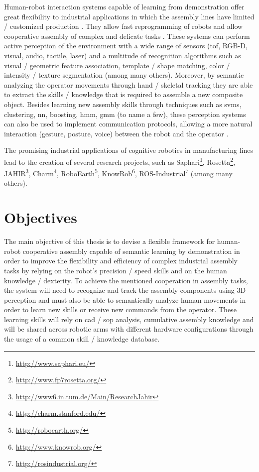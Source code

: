 Human-robot interaction systems capable of learning from demonstration offer great flexibility to industrial applications in which the assembly lines have limited / customized production \cite{Patel2012}. They allow fast reprogramming of robots and allow cooperative assembly of complex and delicate tasks \cite{Sumi2009,Edsinger2007}. These systems can perform active perception of the environment \cite{Yan2014,Goodrich2007} with a wide range of sensors (\gls{tof}, RGB-D, visual, audio, tactile, laser) and a multitude of recognition algorithms such as visual / geometric feature association, template / shape matching, color / intensity / texture segmentation (among many others). Moreover, by semantic analyzing the operator movements \cite{Roitberg2014} through hand / skeletal tracking they are able to extract the skills / knowledge \cite{Nikolaidis14,Goto2013} that is required to assemble a new composite object. Besides learning new assembly skills through techniques such as \glspl{svm}, clustering, \gls{nn}, boosting, \gls{hmm}, \gls{gmm} (to name a few), these perception systems can also be used to implement communication protocols, allowing a more natural interaction (gesture, posture, voice) between the robot and the operator \cite{Gleeson2013,Calisgan2012,Haddadi2013}.

The promising industrial applications of cognitive robotics in manufacturing lines lead to the creation of several research projects, such as Saphari\footnote{\url{http://www.saphari.eu/}}, Rosetta\footnote{\url{http://www.fp7rosetta.org/}}, JAHIR\footnote{\url{http://www6.in.tum.de/Main/ResearchJahir}}, Charm\footnote{\url{http://charm.stanford.edu/}}, RoboEarth\footnote{\url{http://roboearth.org/}}, KnowRob\footnote{\url{http://www.knowrob.org/}}, ROS-Industrial\footnote{\url{http://rosindustrial.org/}} (among many others).



\section{Objectives}

The main objective of this thesis is to devise a flexible framework for human-robot cooperative assembly capable of semantic learning by demonstration in order to improve the flexibility and efficiency of complex industrial assembly tasks by relying on the robot's precision / speed skills and on the human knowledge / dexterity. To achieve the mentioned cooperation in assembly tasks, the system will need to recognize and track the assembly components using 3D perception and must also be able to semantically analyze human movements in order to learn new skills or receive new commands from the operator. These learning skills will rely on \gls{cad} / \gls{sop} analysis, cumulative assembly knowledge and will be shared across robotic arms with different hardware configurations through the usage of a common skill / knowledge database.


